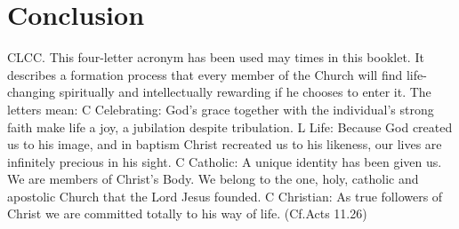 \documentclass{article}
\begin{document}
\section{Conclusion}

CLCC. This four-letter acronym has been used may times in this booklet. It
describes a formation process that every member of the Church will find
life-changing spiritually and intellectually rewarding if he chooses to enter
it.
The letters mean:
C Celebrating: God's grace together with the individual's strong faith make life
a joy, a jubilation
despite tribulation.
L Life: Because God created us to his image, and in baptism Christ recreated us
to his likeness, our lives are infinitely precious in his sight.
C Catholic: A unique identity has been given us. We are members of Christ's
Body. We belong to the
one, holy, catholic and apostolic Church that the Lord Jesus founded.
C Christian: As true followers of Christ we are committed totally to his way of
life. (Cf.Acts 11.26)

\end{document}
